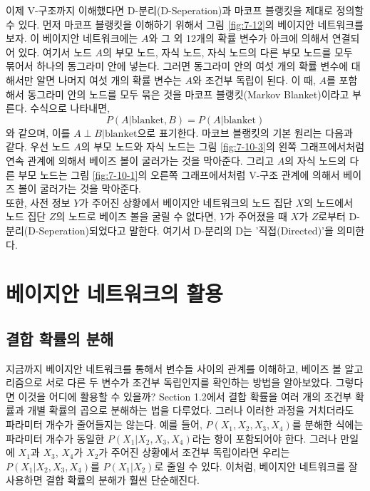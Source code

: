 \documentclass[a4paper]{oblivoir}
\begin{document}
이제 V-구조까지 이해했다면 D-분리(D-Seperation)과 마코프 블랭킷을 제대로 정의할 수 있다. 먼저 마코프 블랭킷을 이해하기 위해서 그림 \ref{fig:7-12}의 베이지안 네트워크를 보자. 이 베이지안 네트워크에는 $A$와 그 외 12개의 확률 변수가 아크에 의해서 연결되어 있다. 여기서 노드 $A$의 부모 노드, 자식 노드, 자식 노드의 다른 부모 노드를 모두 묶어서 하나의 동그라미 안에 넣는다. 그러면 동그라미 안의 여섯 개의 확률 변수에 대해서만 알면 나머지 여섯 개의 확률 변수는 $A$와 조건부 독립이 된다. 이 때, $A$를 포함해서 동그라미 안의 노드를 모두 묶은 것을 마코프 블랭킷(Markov Blanket)이라고 부른다. 수식으로 나타내면, 
\begin{equation}
P(A | \mathrm{blanket}, B) = P(A | \mathrm{blanket})
\label{eq:7-13-3}
\end{equation}
와 같으며, 이를 $A \perp B | \mathrm{blanket}$으로 표기한다. 마코브 블랭킷의 기본 원리는 다음과 같다. 우선 노드 $A$의 부모 노드와 자식 노드는 그림 \ref{fig:7-10-3}의 왼쪽 그래프에서처럼 연속 관계에 의해서 베이즈 볼이 굴러가는 것을 막아준다. 그리고 $A$의 자식 노드의 다른 부모 노드는 그림 \ref{fig:7-10-1}의 오른쪽 그래프에서처럼 V-구조 관계에 의해서 베이즈 볼이 굴러가는 것을 막아준다. \\

또한, 사전 정보 $Y$가 주어진 상황에서 베이지안 네트워크의 노드 집단 $X$의 노드에서 노드 집단 $Z$의 노드로 베이즈 볼을 굴릴 수 없다면, $Y$가 주어졌을 때 $X$가 $Z$로부터 D-분리(D-Seperation)되었다고 말한다. 여기서 D-분리의 D는 '직접(Directed)'을 의미한다.

\section{베이지안 네트워크의 활용}

\subsection{결합 확률의 분해}

지금까지 베이지안 네트워크를 통해서 변수들 사이의 관계를 이해하고, 베이즈 볼 알고리즘으로 서로 다른 두 변수가 조건부 독립인지를 확인하는 방법을 알아보았다. 그렇다면 이것을 어디에 활용할 수 있을까? Section 1.2에서 결합 확률을 여러 개의 조건부 확률과 개별 확률의 곱으로 분해하는 법을 다루었다. 그러나 이러한 과정을 거치더라도 파라미터 개수가 줄어들지는 않는다. 예를 들어, $P(X_1, X_2, X_3, X_4)$를 분해한 식에는 파라미터 개수가 동일한 $P(X_1| X_2, X_3, X_4)$라는 항이 포함되어야 한다. 그러나 만일에 $X_1$과 $X_3$, $X_4$가 $X_2$가 주어진 상황에서 조건부 독립이라면 우리는 $P(X_1| X_2, X_3, X_4)$를 $P(X_1| X_2)$로 줄일 수 있다. 이처럼, 베이지안 네트워크를 잘 사용하면 결합 확률의 분해가 훨씬 단순해진다. \\
\end{document}
